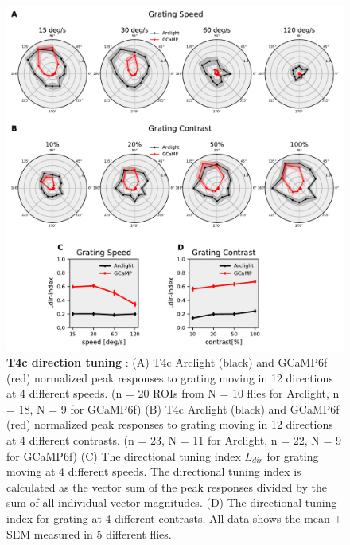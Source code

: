 \documentclass[9pt,lineno]{elife}
\begin{document}
\begin{figure}
\begin{fullwidth}
\includegraphics[width=0.84\linewidth]{figure3}
\caption{\textbf{T4c direction tuning} : (A) T4c Arclight (black) and GCaMP6f (red) normalized peak responses to grating moving in 12 directions at 4 different speeds. (n = 20 ROIs from N = 10 flies for Arclight, n = 18, N = 9 for GCaMP6f) (B) T4c Arclight (black) and GCaMP6f (red) normalized peak responses to grating moving in 12 directions at 4 different contrasts. (n = 23,  N = 11 for Arclight, n = 22, N = 9 for GCaMP6f) (C) The directional tuning index $L_{dir}$ for grating moving at 4 different speeds. The directional tuning index is calculated as the vector sum of the peak responses divided by the sum of all individual vector magnitudes. (D) The directional tuning index for grating at 4 different contrasts. All data shows the mean $\pm$ SEM measured in 5 different flies.}

\label{DirTuning}
	
\end{fullwidth}
\end{figure} 
\end{document}
